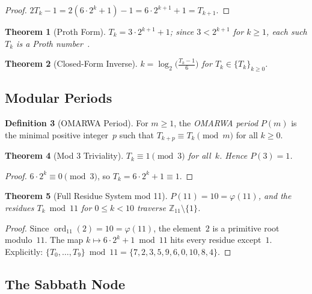 \documentclass[11pt, a4paper]{article}
\theoremstyle{plain}
\newtheorem{theorem}{Theorem}[section]
\theoremstyle{definition}
\newtheorem{definition}[theorem]{Definition}
\theoremstyle{remark}
\newcommand{\ord}{\operatorname{ord}}
\begin{document}
\begin{proof}
$2T_k - 1 = 2(6 \cdot 2^k + 1) - 1 = 6 \cdot 2^{k+1} + 1 = T_{k+1}$.
\end{proof}

\begin{theorem}[Proth Form]\label{thm:proth}
$T_k = 3 \cdot 2^{k+1} + 1$; since $3 < 2^{k+1}$ for $k \geq 1$, each
such $T_k$ is a Proth number~\cite{proth}.
\end{theorem}

\begin{theorem}[Closed-Form Inverse]\label{thm:inverse}
$k = \log_2\!\bigl(\frac{T_k - 1}{6}\bigr)$ for
$T_k \in \{T_k\}_{k \geq 0}$.
\end{theorem}

\subsection{Modular Periods}

\begin{definition}[OMARWA Period]\label{def:period}
For $m \geq 1$, the \emph{OMARWA period} $P(m)$ is the minimal positive
integer~$p$ such that $T_{k+p} \equiv T_k \pmod{m}$ for all $k \geq 0$.
\end{definition}

\begin{theorem}[Mod 3 Triviality]\label{thm:mod3}
$T_k \equiv 1 \pmod{3}$ for all~$k$. Hence $P(3) = 1$.
\end{theorem}

\begin{proof}
$6 \cdot 2^k \equiv 0 \pmod{3}$, so $T_k = 6 \cdot 2^k + 1 \equiv 1$.
\end{proof}

\begin{theorem}[Full Residue System mod 11]\label{thm:fullres}
$P(11) = 10 = \varphi(11)$, and the residues $T_k \bmod 11$ for
$0 \leq k < 10$ traverse $\mathbb{Z}_{11} \setminus \{1\}$.
\end{theorem}

\begin{proof}
Since $\ord_{11}(2) = 10 = \varphi(11)$, the element~$2$ is a
primitive root modulo~$11$. The map $k \mapsto 6 \cdot 2^k + 1 \bmod 11$
hits every residue except~$1$. Explicitly:
$\{T_0, \ldots, T_9\} \bmod 11 = \{7, 2, 3, 5, 9, 6, 0, 10, 8, 4\}$.
\end{proof}

\subsection{The Sabbath Node}\label{sec:sabbath}
\end{document}
